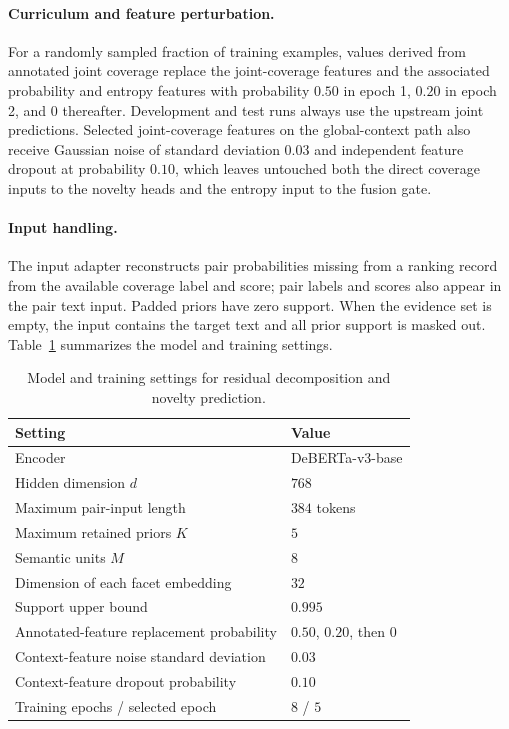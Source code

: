 \paragraph{Curriculum and feature perturbation.}
For a randomly sampled fraction of training examples, values derived from
annotated joint coverage replace the joint-coverage features and the
associated probability and entropy features with probability $0.50$ in epoch
1, $0.20$ in epoch 2, and $0$ thereafter. Development and test runs always use
the upstream joint predictions.
Selected joint-coverage features on the global-context path also receive
Gaussian noise of standard deviation $0.03$ and independent feature dropout at
probability $0.10$, which leaves untouched both the direct coverage inputs to
the novelty heads and the entropy input to the fusion gate.

\paragraph{Input handling.}
The input adapter reconstructs pair probabilities missing from a ranking
record from the available coverage label and score; pair labels and scores
also appear in the pair text input. Padded priors have zero support. When the
evidence set is empty, the input contains the target text and all prior
support is masked out. Table~\ref{tab:residual-settings} summarizes the model
and training settings.

\begin{table}[t]
\centering
\small
\caption{Model and training settings for residual decomposition and novelty prediction.}
\label{tab:residual-settings}
\begin{tabular}{ll}
\toprule
Setting & Value \\
\midrule
Encoder & DeBERTa-v3-base \\
Hidden dimension $d$ & $768$ \\
Maximum pair-input length & $384$ tokens \\
Maximum retained priors $K$ & $5$ \\
Semantic units $M$ & $8$ \\
Dimension of each facet embedding & $32$ \\
Support upper bound & $0.995$ \\
Annotated-feature replacement probability & $0.50$, $0.20$, then $0$ \\
Context-feature noise standard deviation & $0.03$ \\
Context-feature dropout probability & $0.10$ \\
Training epochs / selected epoch & $8$ / $5$ \\
\bottomrule
\end{tabular}
\end{table}
